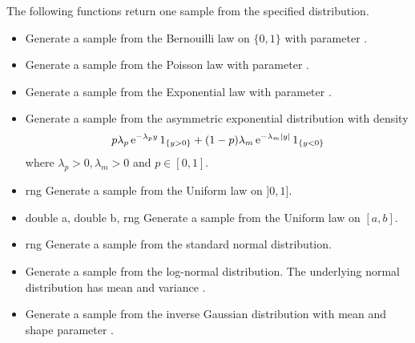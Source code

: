 The following functions return one sample from the specified distribution.
\begin{itemize}
\item {}
  \sshortdescribe Generate a sample from the Bernouilli law on $\{0, 1\}$ with
  parameter .

\item {}
  \sshortdescribe Generate a sample from the Poisson law with
  parameter .

\item {}
  \sshortdescribe Generate a sample from the Exponential law with
  parameter .

\item {}
  \sshortdescribe Generate a sample from the asymmetric exponential distribution
  with density 
  \begin{equation*}
    p \lambda_p \operatorname{e}^{ -\lambda_p y } 1_{\left\{y > 0\right\}} + (1-p) \lambda_m
    \operatorname{e}^{ -\lambda_m |y| } 1_{\left\{y < 0\right\}}
  \end{equation*}
  where $\lambda_p >0, \lambda_m >0$ and $p \in [0, 1]$.

\item {} {\PnlRng \ptr rng}
  \sshortdescribe Generate a sample from the Uniform law on $]0, 1]$.

\item {} {double a, double b,
    \PnlRng \ptr rng}
  \sshortdescribe Generate a sample from the Uniform law on $[a, b]$.

\item {} {\PnlRng \ptr rng}
  \sshortdescribe Generate a sample from the standard normal distribution.

\item {}
  \sshortdescribe Generate a sample from the log-normal distribution. The
  underlying normal distribution has mean  and variance .

\item {}
  \sshortdescribe Generate a sample from the inverse Gaussian distribution with
  mean  and shape parameter .


\end{itemize}
